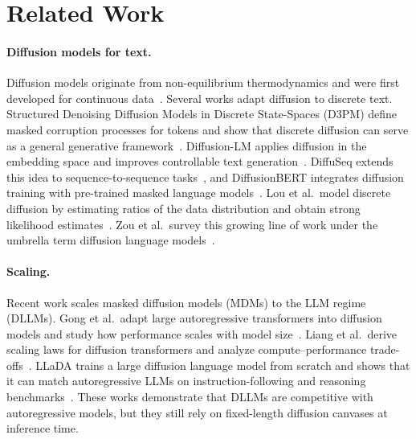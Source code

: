 \documentclass{article}
\theoremstyle{plain}
\theoremstyle{definition}
\theoremstyle{remark}
\begin{document}
\section{Related Work}
\label{sec:related_work}

\paragraph{Diffusion models for text.}
Diffusion models originate from non-equilibrium thermodynamics and were first developed for continuous data~\citep{SohlDickstein2015,Ho2020DDPM}.
Several works adapt diffusion to discrete text.
Structured Denoising Diffusion Models in Discrete State-Spaces (D3PM) define masked corruption processes for tokens and show that discrete diffusion can serve as a general generative framework~\citep{Austin2021D3PM}.
Diffusion-LM applies diffusion in the embedding space and improves controllable text generation~\citep{Li2022DiffusionLM}.
DiffuSeq extends this idea to sequence-to-sequence tasks~\citep{Gong2022DiffuSeq}, and DiffusionBERT integrates diffusion training with pre-trained masked language models~\citep{He2022}.
Lou et al.\ model discrete diffusion by estimating ratios of the data distribution and obtain strong likelihood estimates~\citep{lou2024discretediffusionmodelingestimating}.
Zou et al.\ survey this growing line of work under the umbrella term diffusion language models~\citep{Zou2023}.

\paragraph{Scaling.} Recent work scales masked diffusion models (MDMs) to the LLM regime (DLLMs).
Gong et al.\ adapt large autoregressive transformers into diffusion models and study how performance scales with model size~\citep{Gong2025}.
Liang et al.\ derive scaling laws for diffusion transformers and analyze compute--performance trade-offs~\citep{Liang2024}.
LLaDA trains a large diffusion language model from scratch and shows that it can match autoregressive LLMs on instruction-following and reasoning benchmarks~\citep{nie2025large}.
These works demonstrate that DLLMs are competitive with autoregressive models, but they still rely on fixed-length diffusion canvases at inference time.
\end{document}
